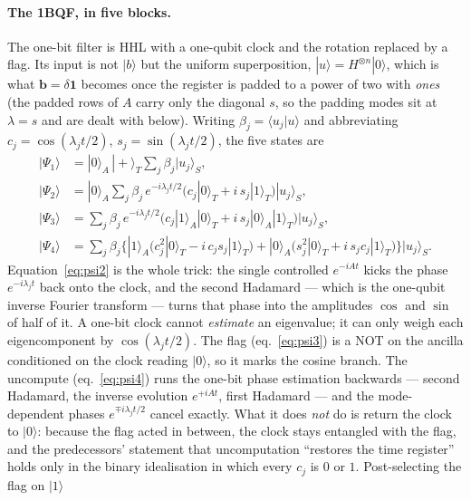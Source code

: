 \documentclass[11pt,a4paper]{article}
\begin{document}
\paragraph{The 1BQF, in five blocks.} The one-bit filter is HHL with a
one-qubit clock and the rotation replaced by a flag. Its input is not
$|b\rangle$ but the uniform superposition, $|u\rangle=H^{\otimes n}|0\rangle$,
which is what $\mathbf{b}=\delta\mathbf{1}$ becomes once the register is padded
to a power of two with \emph{ones} (the padded rows of $A$ carry only the
diagonal $s$, so the padding modes sit at $\lambda=s$ and are dealt with
below). Writing $\beta_j=\langle u_j|u\rangle$ and abbreviating
$c_j=\cos(\lambda_jt/2)$, $s_j=\sin(\lambda_jt/2)$, the five states are
\begin{align}
|\Psi_1\rangle&=|0\rangle_A\,|{+}\rangle_T\sum_j\beta_j|u_j\rangle_S ,
\label{eq:psi1}\\
|\Psi_2\rangle&=|0\rangle_A\sum_j\beta_j\,e^{-i\lambda_jt/2}
\big(c_j|0\rangle_T+i\,s_j|1\rangle_T\big)|u_j\rangle_S ,
\label{eq:psi2}\\
|\Psi_3\rangle&=\sum_j\beta_j\,e^{-i\lambda_jt/2}
\big(c_j|1\rangle_A|0\rangle_T+i\,s_j|0\rangle_A|1\rangle_T\big)|u_j\rangle_S ,
\label{eq:psi3}\\
|\Psi_4\rangle&=\sum_j\beta_j\Big\{|1\rangle_A\big(c_j^{2}|0\rangle_T-i\,c_js_j|1\rangle_T\big)
+|0\rangle_A\big(s_j^{2}|0\rangle_T+i\,s_jc_j|1\rangle_T\big)\Big\}|u_j\rangle_S .
\label{eq:psi4}
\end{align}
Equation~\eqref{eq:psi2} is the whole trick: the single controlled
$e^{-iAt}$ kicks the phase $e^{-i\lambda_jt}$ back onto the clock, and the
second Hadamard --- which is the one-qubit inverse Fourier transform ---
turns that phase into the amplitudes $\cos$ and $\sin$ of half of it. A
one-bit clock cannot \emph{estimate} an eigenvalue; it can only weigh each
eigencomponent by $\cos(\lambda_jt/2)$. The flag (eq.~\ref{eq:psi3}) is a
NOT on the ancilla conditioned on the clock reading $|0\rangle$, so it marks
the cosine branch. The uncompute (eq.~\ref{eq:psi4}) runs the one-bit phase
estimation backwards --- second Hadamard, the inverse evolution $e^{+iAt}$,
first Hadamard --- and the mode-dependent phases $e^{\mp i\lambda_jt/2}$
cancel exactly. What it does \emph{not} do is return the clock to
$|0\rangle$: because the flag acted in between, the clock stays entangled
with the flag, and the predecessors' statement that uncomputation
``restores the time register'' holds only in the binary idealisation in
which every $c_j$ is $0$ or $1$. Post-selecting the flag on $|1\rangle$
\end{document}
